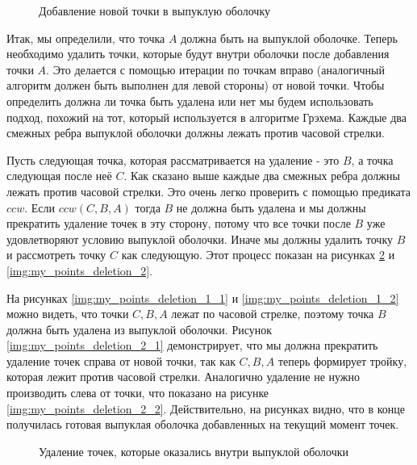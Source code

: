 \begin{figure}
	{\centering
		\hfill
		\subbottom[\label{img:my_point_cases_1}]{%
			}
		\hfill
		\subbottom[\label{img:my_point_cases_2}]{%
			}
		\hfill
	}
	\caption{Добавление новой точки в выпуклую оболочку}
	\label{img:my_point_cases}
\end{figure}

Итак, мы определили, что точка $A$ должна быть на выпуклой оболочке. Теперь необходимо удалить точки, которые будут внутри оболочки после добавления точки $A$. Это делается с помощью итерации по точкам вправо (аналогичный алгоритм должен быть выполнен для левой стороны) от новой точки. Чтобы определить должна ли точка быть удалена или нет мы будем использовать подход, похожий на тот, который используется в алгоритме Грэхема. Каждые два смежных ребра выпуклой оболочки должны лежать против часовой стрелки.

Пусть следующая точка, которая рассматривается на удаление - это $B$, а точка следующая после неё $C$. Как сказано выше каждые два смежных ребра должны лежать против часовой стрелки. Это очень легко проверить с помощью предиката $ccw$. Если $ccw(C, B, A)$ тогда $B$ не должна быть удалена и мы должны прекратить удаление точек в эту сторону, потому что все точки после $B$ уже удовлетворяют условию выпуклой оболочки. Иначе мы должны удалить точку $B$ и рассмотреть точку $C$ как следующую. Этот процесс показан на рисунках \ref{img:my_points_deletion_1} и \ref{img:my_points_deletion_2}.

На рисунках \ref{img:my_points_deletion_1_1} и \ref{img:my_points_deletion_1_2} можно видеть, что точки $C, B, A$ лежат по часовой стрелке, поэтому точка $B$ должна быть удалена из выпуклой оболочки. Рисунок \ref{img:my_points_deletion_2_1} демонстрирует, что мы должна прекратить удаление точек справа от новой точки, так как $C, B, A$ теперь формирует тройку, которая лежит против часовой стрелки. Аналогично удаление не нужно производить слева от точки, что показано на рисунке \ref{img:my_points_deletion_2_2}. Действительно, на рисунках видно, что в конце получилась готовая выпуклая оболочка добавленных на текущий момент точек.

\begin{figure}
	{\centering
		\hfill
		\subbottom[\label{img:my_points_deletion_1_1}]{%
			}
		\hfill
		\subbottom[\label{img:my_points_deletion_1_2}]{%
			}
		\hfill
	}
	\caption{Удаление точек, которые оказались внутри выпуклой оболочки}
	\label{img:my_points_deletion_1}
\end{figure}

